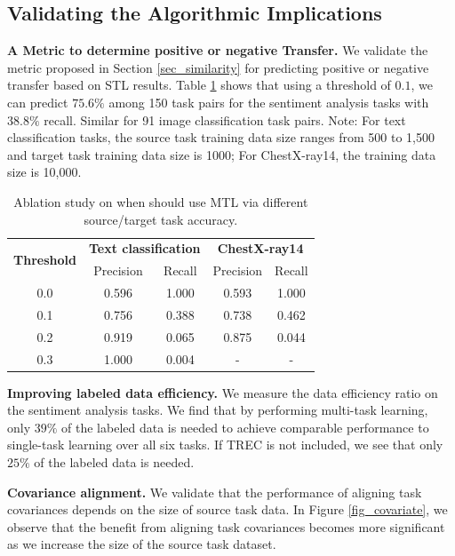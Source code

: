 \subsection{Validating the Algorithmic Implications}

\textbf{A Metric to determine positive or negative Transfer.}
We validate the metric proposed in Section \ref{sec_similarity} for predicting positive or negative transfer based on STL results.
Table \ref{tab:mtl_better_than_stl} shows that using a threshold of $0.1$, we can predict $75.6\%$ among 150 task pairs for the sentiment analysis tasks with $38.8\%$ recall.
Similar for 91 image classification task pairs.
Note: For text classification tasks, the source task training data size ranges from 500 to 1,500 and target task training data size is 1000; For ChestX-ray14, the training data size is 10,000.

\begin{table}
\begin{center}
  \begin{tabular}{c c c c c}
  \toprule
    \multirow{2}{*}{{\bf Threshold}}  & \multicolumn{2}{c}{{\bf Text classification}} & \multicolumn{2}{c}{{\bf ChestX-ray14}} \\
    & Precision &  Recall & Precision &  Recall \\
    \cmidrule(lr){1-1} \cmidrule(lr){2-3} \cmidrule(lr){4-5}
    0.0 & 0.596 & 1.000 & 0.593 & 1.000 \\
    0.1 & 0.756 & 0.388 & 0.738 & 0.462 \\
    0.2 & 0.919 & 0.065 & 0.875 & 0.044 \\	
    0.3 & 1.000 & 0.004 &     - &     - \\
  \bottomrule
  \end{tabular}
\end{center}
\caption{Ablation study on when should use MTL via different source/target task accuracy.}
\label{tab:mtl_better_than_stl}
\end{table}

\textbf{Improving labeled data efficiency.}
We measure the data efficiency ratio on the sentiment analysis tasks.
We find that by performing multi-task learning, only $39\%$ of the labeled data is needed to achieve comparable performance to single-task learning over all six tasks.
If TREC is not included, we see that only $25\%$ of the labeled data is needed.


\textbf{Covariance alignment.}
We validate that the performance of aligning task covariances depends on the size of source task data.
In Figure \ref{fig_covariate}, we observe that the benefit from aligning task covariances becomes more significant as we increase the size of the source task dataset.

